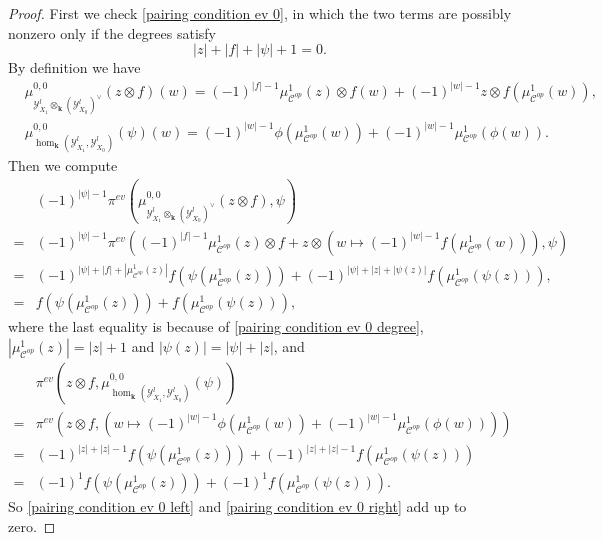 \documentclass[11pt]{amsproc}
\def\K{{\mathbf{k}}}
\def\Y{\mathcal{Y}}
\def\cc{\mathcal{C}}
\theoremstyle{remark}
\numberwithin{equation}{section}
\begin{document}
\begin{proof}
First we check \eqref{pairing condition ev 0},
in which the two terms are possibly nonzero only if the degrees satisfy
\begin{equation}\label{pairing condition ev 0 degree}
|z| + |f| + |\psi| + 1 = 0.
\end{equation}
By definition we have
\begin{align}
& \mu_{\Y^{l}_{X_{1}} \otimes_{\K} (\Y^{l}_{X_{0}})^{\vee}}^{0, 0}(z \otimes f)(w) =   (-1)^{|f| - 1} \mu^{1}_{\cc^{op}}(z) \otimes f(w) + (-1)^{|w| - 1} z \otimes f(\mu^{1}_{\cc^{op}}(w)) , \\
& \mu_{\hom_{\K}(\Y^{l}_{X_{1}}, \Y^{l}_{X_{0}})}^{0, 0}(\psi)(w) = (-1)^{|w|-1} \phi(\mu^{1}_{\cc^{op}}(w)) + (-1)^{ |w| - 1} \mu^{1}_{\cc^{op}}(\phi(w)).
\end{align}
Then we compute
\begin{equation}\label{pairing condition ev 0 left}
\begin{split}
& (-1)^{|\psi|-1} \pi^{ev}(\mu_{\Y^{l}_{X_{1}} \otimes_{\K} (\Y^{l}_{X_{0}})^{\vee}}^{0, 0}(z \otimes f), \psi) \\
= & (-1)^{|\psi|-1} \pi^{ev}((-1)^{|f| - 1} \mu^{1}_{\cc^{op}}(z) \otimes f +  z \otimes (w \mapsto (-1)^{|w| - 1}f(\mu^{1}_{\cc^{op}}(w))), \psi)\\
= & (-1)^{|\psi| + |f| + |\mu^{1}_{\cc^{op}}(z)|}  f(\psi(\mu^{1}_{\cc^{op}}(z))) + (-1)^{|\psi| + |z| + |\psi(z)| } f(\mu^{1}_{\cc^{op}}(\psi(z))) ,\\
= & f(\psi(\mu^{1}_{\cc^{op}}(z))) + f(\mu^{1}_{\cc^{op}}(\psi(z))),
\end{split}
\end{equation}
where the last equality is because of \eqref{pairing condition ev 0 degree}, $|\mu^{1}_{\cc^{op}}(z)| = |z| + 1$ and $|\psi(z)| = |\psi| + |z|$, and 
\begin{equation}\label{pairing condition ev 0 right}
\begin{split}
& \pi^{ev}(z \otimes f, \mu_{\hom_{\K}(\Y^{l}_{X_{1}}, \Y^{l}_{X_{0}})}^{0, 0}(\psi))\\
= & \pi^{ev}(z \otimes f, (w \mapsto (-1)^{|w|-1} \phi(\mu^{1}_{\cc^{op}}(w)) + (-1)^{ |w| - 1} \mu^{1}_{\cc^{op}}(\phi(w)))) \\
= & (-1)^{|z| + |z| - 1} f(\psi(\mu^{1}_{\cc^{op}}(z))) + (-1)^{|z| + |z| - 1} f(\mu^{1}_{\cc^{op}}(\psi(z))) \\
= & (-1)^{1} f(\psi(\mu^{1}_{\cc^{op}}(z)))  + (-1)^{1} f(\mu^{1}_{\cc^{op}}(\psi(z))).
\end{split}
\end{equation}
So \eqref{pairing condition ev 0 left} and \eqref{pairing condition ev 0 right} add up to zero.


\end{proof}
\end{document}

